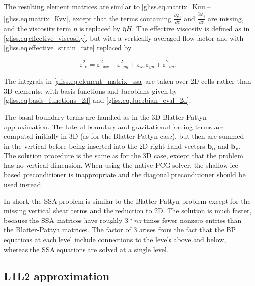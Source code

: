 {\noindent
The resulting element matrices are similar to \eqref{gliss.eq.matrix_Kuu}--\eqref{gliss.eq.matrix_Kvv},
except that the terms containing $\frac{\partial {{\varphi }_{i}}}{\partial z}$ and
$\frac{\partial {{\varphi }_{j}}}{\partial z}$ are missing, and the viscosity term $\eta$
is replaced by $\bar{\eta} H$.  The effective viscosity is defined as in \eqref{gliss.eq.effective_viscosity},
but with a vertically averaged flow factor and with \eqref{gliss.eq.effective_strain_rate} replaced by

\begin{equation}
  \label{gliss.eq.effective_strain_rate_ssa}
        {{\dot{\varepsilon }}^{2}}_{e} = 
        {{\dot{\varepsilon }}^{2}}_{xx} + {{\dot{\varepsilon }}^{2}}_{yy} + 
        {{\dot{\varepsilon }}_{xx}}{{\dot{\varepsilon }}_{yy}} + {{\dot{\varepsilon }}^{2}}_{xy}.
\end{equation}

\noindent
The integrals in \eqref{gliss.eq.element_matrix_ssa} are taken over 2D cells rather than 3D elements,
with basis functions and Jacobians given by \eqref{gliss.eq.basis_functions_2d}
and \eqref{gliss.eq.Jacobian_eval_2d}.

The basal boundary terms are handled as in the 3D Blatter-Pattyn approximation. 
The lateral boundary and gravitational forcing terms are computed initially in 3D
(as for the Blatter-Pattyn case), but then are summed in the vertical before being
inserted into the 2D right-hand vectors $\mathbf{b_u}$ and $\mathbf{b_v}$.  The solution procedure
is the same as for the 3D case, except that the problem has no vertical dimension.
When using the native PCG solver, the shallow-ice-based preconditioner is inappropriate
and the diagonal preconditioner should be used instead.  

In short, the SSA problem is similar to the Blatter-Pattyn problem except for the
missing vertical shear terms and the reduction to 2D.  The solution is much faster, because the SSA matrices
have roughly $3*nz$ times fewer nonzero entries than the Blatter-Pattyn matrices.
The factor of 3 arises from the fact that the BP equations at each level include
connections to the levels above and below, whereas the SSA equations
are solved at a single level.

\subsection{L1L2 approximation}

}
